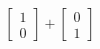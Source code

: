 \documentclass[preview]{standalone}
\begin{document}
\begin{align*}
\begin{bmatrix} 1 \\ 0 \end{bmatrix} + \begin{bmatrix} 0 \\ 1 \end{bmatrix}
\end{align*}
\end{document}

